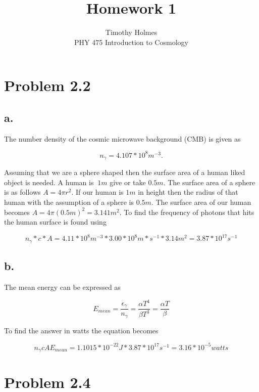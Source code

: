\documentclass[12pt]{article}
\begin{document}
 
 
\title{Homework 1}
\author{Timothy Holmes\\ %
PHY 475 Introduction to Cosmology}

\maketitle

\section*{Problem 2.2}

\subsection*{a.}

The number density of the cosmic microwave background (CMB) is given as 

$$
n_{\gamma} = 4.107*10^{8} m^{-3}.
$$

Assuming that we are a sphere shaped then the surface area of a human liked object is needed. A human is $~1m$ give or take $0.5m$. The surface area of a sphere is as follows $A = 4\pi r^2$. If our human is $1m$ in height then the radius of that human with the assumption of a sphere is $0.5m$. The surface area of our human becomes $A = 4\pi (0.5m)^2 = 3.141m^2$. To find the frequency of photons that hits the human surface is found using 

$$
n_{\gamma}*c*A = 4.11*10^{8}m^{-3}*3.00*10^{8}m*s^{-1}*3.14m^{2} = 3.87*10^{17} s^{-1}
$$

\subsection*{b.}

The mean energy can be expressed as 

$$
E_{mean} = \frac{\epsilon_{\gamma}}{n_{\gamma}} =
\frac{\alpha T^{4}}{\beta T^{3}} = 
\frac{\alpha T}{\beta} 
$$


To find the answer in watts the equation becomes

$$
n_{\gamma}cAE_{mean} = 1.1015*10^{-22} J * 3.87*10^{17} s^{-1} = 3.16*10^{-5} watts
$$

\section*{Problem 2.4}
\end{document}
